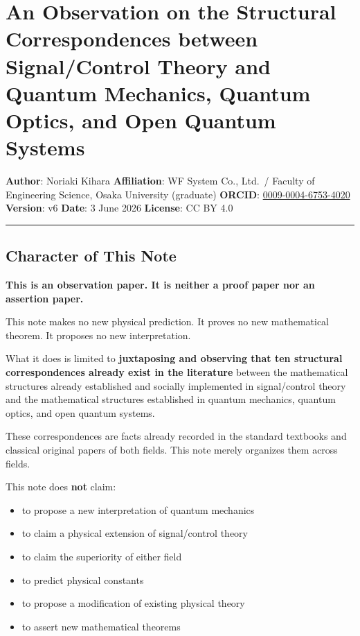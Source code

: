 \documentclass[
]{article}
\author{}
\date{}
\providecommand{\tightlist}{%
  \setlength{\itemsep}{0pt}\setlength{\parskip}{0pt}}
\begin{document}
\section{An Observation on the Structural Correspondences between
Signal/Control Theory and Quantum Mechanics, Quantum Optics, and Open
Quantum
Systems}\label{an-observation-on-the-structural-correspondences-between-signalcontrol-theory-and-quantum-mechanics-quantum-optics-and-open-quantum-systems}

\textbf{Author}: Noriaki Kihara \textbf{Affiliation}: WF System Co.,
Ltd.~/ Faculty of Engineering Science, Osaka University (graduate)
\textbf{ORCID}:
\href{https://orcid.org/0009-0004-6753-4020}{0009-0004-6753-4020}
\textbf{Version}: v6 \textbf{Date}: 3 June 2026 \textbf{License}: CC BY
4.0

\begin{center}\rule{0.5\linewidth}{0.5pt}\end{center}

\subsection{Character of This Note}\label{character-of-this-note}

\textbf{This is an observation paper. It is neither a proof paper nor an
assertion paper.}

This note makes no new physical prediction. It proves no new
mathematical theorem. It proposes no new interpretation.

What it does is limited to \textbf{juxtaposing and observing that ten
structural correspondences already exist in the literature} between the
mathematical structures already established and socially implemented in
signal/control theory and the mathematical structures established in
quantum mechanics, quantum optics, and open quantum systems.

These correspondences are facts already recorded in the standard
textbooks and classical original papers of both fields. This note merely
organizes them across fields.

This note does \textbf{not} claim:

\begin{itemize}
\tightlist
\item
  to propose a new interpretation of quantum mechanics
\item
  to claim a physical extension of signal/control theory
\item
  to claim the superiority of either field
\item
  to predict physical constants
\item
  to propose a modification of existing physical theory
\item
  to assert new mathematical theorems
\end{itemize}
\end{document}

